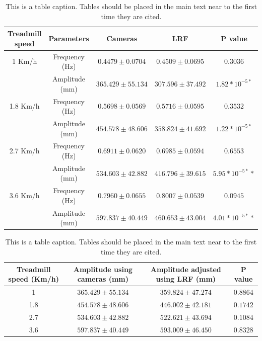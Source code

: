 \documentclass[journal,article,submit,moreauthors,pdftex,10pt,a4paper]{mdpi}
\theoremstyle{mdpi}
\newcounter{ex}
\newcounter{re}
\theoremstyle{mdpidefinition}
\begin{document}
\begin{table}[H]
\caption{This is a table caption. Tables should be placed in the main text near to the first time they are cited.}
\small %
\centering
\begin{tabular}{ccccc}
\toprule
\textbf{Treadmill speed}	& \textbf{Parameters}	& \textbf{Cameras}	& \textbf{LRF}  & \textbf{P value}\\
\midrule
1 Km/h		& Frequency	(Hz)	& $0.4479 \pm 0.0704$	& $0.4509 \pm 0.0695$	& $0.3036$\\
			& Amplitude	(mm)	& $365.429 \pm 55.134$	& $307.596 \pm 37.492$	& $1.82*10^{-5*}$\\
1.8 Km/h	& Frequency	(Hz)	& $0.5698 \pm 0.0569$ 	& $0.5716 \pm 0.0595$	& $0.3532$\\
			& Amplitude	(mm)	& $454.578 \pm 48.606$	& $358.824 \pm 41.692$	& $1.22*10^{-5*}$\\
2.7 Km/h	& Frequency	(Hz)	& $0.6911 \pm 0.0620$	& $0.6985 \pm 0.0594$	& $0.6553$\\
			& Amplitude	(mm)	& $534.603 \pm 42.882$	& $416.796 \pm 39.615$	& $5.95*10^{-5*}*$\\
3.6 Km/h	& Frequency	(Hz)	& $0.7960 \pm 0.0655$ 	& $0.8007 \pm 0.0539$ 	& $0.0945$\\
			& Amplitude	(mm)	& $597.837 \pm 40.449$	& $ 460.653 \pm 43.004$	& $4.01*10^{-5*}*$\\
\bottomrule
\end{tabular}
\end{table}

\begin{table}[H]
\caption{This is a table caption. Tables should be placed in the main text near to the first time they are cited.}
\small %
\centering
\begin{tabular}{cccc}
\toprule
\textbf{Treadmill speed (Km/h)}	& \textbf{Amplitude using cameras  (mm)}	& \textbf{Amplitude adjusted using LRF (mm)} & \textbf{P value}\\
\midrule
1 		& $365.429 \pm 55.134$	& $359.824 \pm 47.274$ & $0.8864$\\
1.8		& $454.578 \pm 48.606$	& $446.002 \pm 42.181$ & $0.1742$\\
2.7 	& $534.603 \pm 42.882$	& $522.621 \pm 43.694$ & $0.1084$\\
3.6 	& $597.837 \pm 40.449$	& $593.009 \pm 46.450$ & $0.8328$\\

\bottomrule
\end{tabular}
\end{table}
\end{document}
